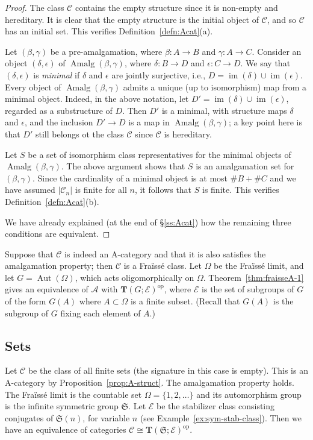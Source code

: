 \documentclass[12pt]{amsart}
\numberwithin{equation}{section}
\theoremstyle{definition}
\newcommand{\cA}{\mathcal{A}}
\newcommand{\rA}{\mathrm{A}}
\newcommand{\cC}{\mathcal{C}}
\newcommand{\sE}{\mathscr{E}}
\newcommand{\fS}{\mathfrak{S}}
\newcommand{\bT}{\mathbf{T}}
\newcommand{\defn}[1]{\emph{#1}}
\DeclareMathOperator{\im}{im}
\DeclareMathOperator{\Aut}{Aut}
\newcommand{\op}{\mathrm{op}}
\DeclareMathOperator{\Amalg}{Amalg}
\begin{document}
\begin{proof}
The class $\cC$ contains the empty structure since it is non-empty and hereditary. It is clear that the empty structure is the initial object of $\cC$, and so $\cC$ has an initial set. This verifies Definition~\ref{defn:Acat}(a).

Let $(\beta, \gamma)$ be a pre-amalgamation, where $\beta \colon A \to B$ and $\gamma \colon A \to C$. Consider an object $(\delta, \epsilon)$ of $\Amalg(\beta,\gamma)$, where $\delta \colon B \to D$ and $\epsilon \colon C \to D$. We say that $(\delta,\epsilon)$ is \defn{minimal} if $\delta$ and $\epsilon$ are jointly surjective, i.e., $D=\im(\delta) \cup \im(\epsilon)$. Every object of $\Amalg(\beta,\gamma)$ admits a unique (up to isomorphism) map from a minimal object. Indeed, in the above notation, let $D'=\im(\delta) \cup \im(\epsilon)$, regarded as a substructure of $D$. Then $D'$ is a minimal, with structure maps $\delta$ and $\epsilon$, and the inclusion $D' \to D$ is a map in $\Amalg(\beta,\gamma)$; a key point here is that $D'$ still belongs ot the class $\cC$ since $\cC$ is hereditary.

Let $S$ be a set of isomorphism class representatives for the minimal objects of $\Amalg(\beta,\gamma)$. The above argument shows that $S$ is an amalgamation set for $(\beta, \gamma)$. Since the cardinality of a minimal object is at most $\# B + \# C$ and we have assumed $\vert \cC_n \vert$ is finite for all $n$, it follows that $S$ is finite. This verifies Definition~\ref{defn:Acat}(b).

We have already explained (at the end of \S \ref{ss:Acat}) how the remaining three conditions are equivalent.
\end{proof}

Suppose that $\cC$ is indeed an $\rA$-category and that it is also satisfies the amalgamation property; then $\cC$ is a Fra\"iss\'e class. Let $\Omega$ be the Fra\"iss\'e limit, and let $G=\Aut(\Omega)$, which acts oligomorphically on $\Omega$. Theorem~\ref{thm:fraisseA-1} gives an equivalence of $\cA$ with $\bT(G;\sE)^{\op}$, where $\sE$ is the set of subgroups of $G$ of the form $G(A)$ where $A \subset \Omega$ is a finite subset. (Recall that $G(A)$ is the subgroup of $G$ fixing each element of $A$.)

\subsection{Sets} \label{ss:sets}

Let $\cC$ be the class of all finite sets (the signature in this case is empty). This is an $\rA$-category by Proposition~\ref{prop:A-struct}. The amalgamation property holds. The Fra\"iss\'e limit is the countable set $\Omega=\{1,2,\ldots\}$ and its automorphism group is the infinite symmetric group $\fS$. Let $\sE$ be the stabilizer class consisting conjugates of $\fS(n)$, for variable $n$ (see Example~\ref{ex:sym-stab-class}). Then we have an equivalence of categories $\cC \cong \bT(\fS;\sE)^{\op}$.
\end{document}
